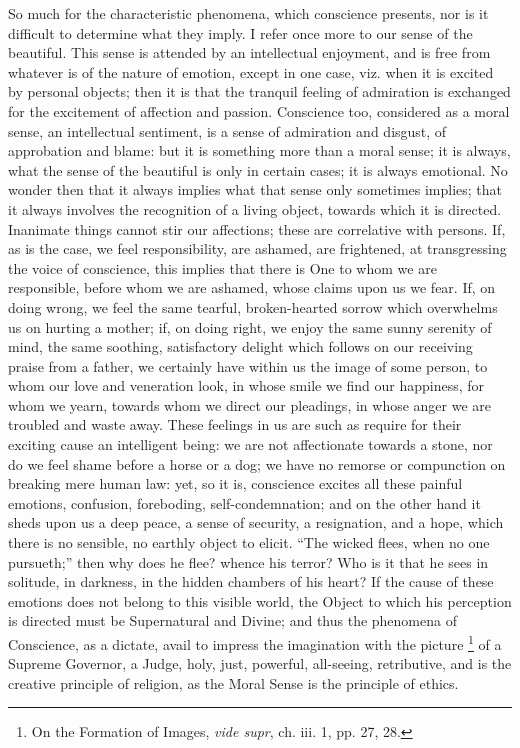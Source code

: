 So much for the characteristic phenomena, which conscience
presents, nor is it difficult to determine what they imply. I refer
once more to our sense of the beautiful. This sense is attended by an
intellectual enjoyment, and is free from whatever is of the nature of
emotion, except in one case, viz. when it is excited by personal
objects; then it is that the tranquil feeling of admiration is
exchanged for the excitement of affection and passion. Conscience too,
considered as a moral sense, an intellectual sentiment, is a sense of
admiration and disgust, of approbation and blame: but it is something
more than a moral sense; it is always, what the sense of the beautiful
is only in certain cases; it is always emotional. No wonder then that
it always implies what that sense only sometimes implies; that it
always involves the recognition of a living object, towards which it
is directed. Inanimate things cannot stir our affections; these are
correlative with persons. If, as is the case, we feel responsibility,
are ashamed, are frightened, at transgressing the voice of conscience,
this implies that there is One to whom we are responsible, before whom
we are ashamed, whose claims upon us we fear. If, on doing wrong, we
feel the same tearful, broken-hearted sorrow which overwhelms us on
hurting a mother; if, on doing right, we enjoy the same sunny serenity
of mind, the same soothing, satisfactory delight which follows on our
receiving praise from a father, we certainly have within us the image
of some person, to whom our love and veneration look, in whose smile
we find our happiness, for whom we yearn, towards whom we direct our
pleadings, in whose anger we are troubled and waste away. These
feelings in us are such as require for their exciting cause an
intelligent being: we are not affectionate towards a stone, nor do we
feel shame before a horse or a dog; we have no remorse or compunction
on breaking mere human law: yet, so it is, conscience excites all
these painful emotions, confusion, foreboding, self-condemnation; and
on the other hand it sheds upon us a deep peace, a sense of security,
a resignation, and a hope, which there is no sensible, no earthly
object to elicit. ``The wicked flees, when no one pursueth;''
then why does he flee? whence his terror? Who is it that he sees in
solitude, in darkness, in the hidden chambers of his heart? If the
cause of these emotions does not belong to this visible world, the
Object to which his perception is directed must be Supernatural and
Divine; and thus the phenomena of Conscience, as a dictate, avail to
impress the imagination with the picture \footnote{On the Formation of Images, \emph{vide supr}, ch. iii. 1, pp. 27,
28.}
of a Supreme Governor, a Judge, holy, just, powerful, all-seeing,
retributive, and is the creative principle of religion, as the Moral
Sense is the principle of ethics.


